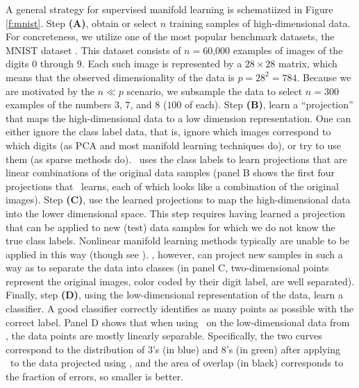 \documentclass[10pt]{article}
\begin{document}
A general strategy for supervised manifold learning is schematiized in Figure \ref{f:mnist}.
Step \textbf{(A)},  obtain or select $n$ training samples of high-dimensional data.  For concreteness, we utilize one of the most popular benchmark datasets, the MNIST dataset \cite{mnist}.  This dataset consists of $n=60$,$000$ examples of images of the digits $0$ through $9$.  Each such image is represented by a $28\times28$ matrix, which means that the observed  dimensionality of the data is $p=28^2=784$.  Because we are motivated by the $n \ll p$ scenario, we subsample the data to select $n=300$ examples of the numbers $3$, $7$, and $8$ ($100$ of each).
%
Step \textbf{(B)},  learn a ``projection'' that maps the high-dimensional data to a low dimension representation.  One can either ignore the class label data, that is, ignore which images correspond to which digits (as PCA and most manifold learning techniques do), or try to use them (as sparse methods do).  \Lol~uses the class labels to learn projections that are linear combinations of the original data samples (panel B shows the first four projections that \Lol~learns, each of which looks like a combination of the original images).  
%
Step \textbf{(C)}, use the learned projections to map the high-dimensional data into the lower dimensional space. This step requires having learned a projection that can be applied to new (test) data samples for which we do not know the true class labels.  Nonlinear manifold learning methods typically are unable to be applied in this way (though see \cite{Bengio2004}).  \Lol, however, can project new samples in such a way as to separate the data into classes (in panel C, two-dimensional points represent the original images, color coded by their digit label, are well separated).
Finally, step \textbf{(D)}, using the low-dimensional representation of the data, learn a classifier.  A good classifier correctly identifies as many points as possible with the correct label.  Panel D shows that when using \Lda~on the low-dimensional data from \Lol, the data points are mostly linearly separable.  
Specifically, the two curves correspond to the distribution of $3$'s (in blue) and $8$'s (in green) after applying \Lda~to the data projected using \Lol, and the area of overlap (in black) corresponds to the fraction of errors, so smaller is better. 



\end{document}
